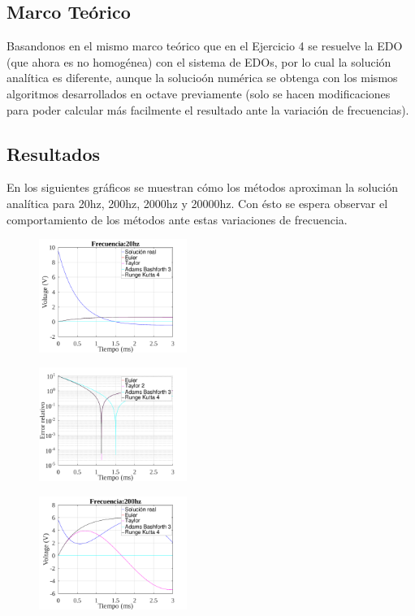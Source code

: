 \documentclass[letterpaper, 10 pt, conference]{ieeeconf}  %
\begin{document}
\subsection{Marco Te\'orico}

Basandonos en el mismo marco te\'orico que en el Ejercicio 4 se resuelve la EDO (que ahora es no homog\'enea) con el sistema de EDOs, por lo cual la soluci\'on anal\'itica es diferente, aunque la solucio\'on num\'erica se obtenga con los mismos algoritmos desarrollados en octave previamente (solo se hacen modificaciones para poder calcular m\'as facilmente el resultado ante la variaci\'on de frecuencias).

\subsection{Resultados}

En los siguientes gr\'aficos se muestran c\'omo los m\'etodos aproximan la soluci\'on anal\'itica para 20hz, 200hz, 2000hz y 20000hz. Con \'esto se espera observar el comportamiento de los m\'etodos ante estas variaciones de frecuencia.

\begin{figure}[H]
\centering
\includegraphics[width=0.43\textwidth]{../plots/ej5/Frecuencia:20hz.png}
\label{fig:fig}
\end{figure}

\begin{figure}[H]
\centering
\includegraphics[width=0.43\textwidth]{../plots/ej5/error-20hz.png}
\label{fig:fig}
\end{figure}

\begin{figure}[H]
\centering
\includegraphics[width=0.43\textwidth]{../plots/ej5/Frecuencia:200hz.png}
\label{fig:fig}
\end{figure}
\end{document}
